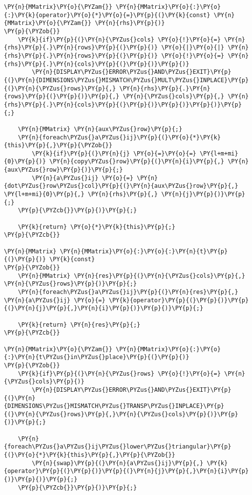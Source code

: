 \begin{Verbatim}[commandchars=\\\{\}]
\PY{n}{MMatrix}\PY{o}{\PYZam{}} \PY{n}{MMatrix}\PY{o}{:}\PY{o}{:}\PY{k}{operator}\PY{o}{*}\PY{o}{=}\PY{p}{(}\PY{k}{const} \PY{n}{MMatrix}\PY{o}{\PYZam{}} \PY{n}{rhs}\PY{p}{)}
\PY{p}{\PYZob{}}
	\PY{k}{if}\PY{p}{(}\PY{n}{\PYZus{}cols} \PY{o}{!}\PY{o}{=} \PY{n}{rhs}\PY{p}{.}\PY{n}{rows}\PY{p}{(}\PY{p}{)} \PY{o}{|}\PY{o}{|} \PY{n}{rhs}\PY{p}{.}\PY{n}{rows}\PY{p}{(}\PY{p}{)} \PY{o}{!}\PY{o}{=} \PY{n}{rhs}\PY{p}{.}\PY{n}{cols}\PY{p}{(}\PY{p}{)}\PY{p}{)}
		\PY{n}{DISPLAY\PYZus{}ERROR\PYZus{}AND\PYZus{}EXIT}\PY{p}{(}\PY{n}{DIMENSIONS\PYZus{}MISMATCH\PYZus{}MULT\PYZus{}INPLACE}\PY{p}{(}\PY{n}{\PYZus{}rows}\PY{p}{,} \PY{n}{rhs}\PY{p}{.}\PY{n}{rows}\PY{p}{(}\PY{p}{)}\PY{p}{,} \PY{n}{\PYZus{}cols}\PY{p}{,} \PY{n}{rhs}\PY{p}{.}\PY{n}{cols}\PY{p}{(}\PY{p}{)}\PY{p}{)}\PY{p}{)}\PY{p}{;}

	\PY{n}{MMatrix} \PY{n}{aux\PYZus{}row}\PY{p}{;}
	\PY{n}{foreach\PYZus{}a\PYZus{}ij}\PY{p}{(}\PY{o}{*}\PY{k}{this}\PY{p}{,}\PY{p}{\PYZob{}}
		\PY{k}{if}\PY{p}{(}\PY{n}{j} \PY{o}{=}\PY{o}{=} \PY{l+m+mi}{0}\PY{p}{)} \PY{n}{copy\PYZus{}row}\PY{p}{(}\PY{n}{i}\PY{p}{,} \PY{n}{aux\PYZus{}row}\PY{p}{)}\PY{p}{;}
		\PY{n}{a\PYZus{}ij} \PY{o}{=} \PY{n}{dot\PYZus{}row\PYZus{}col}\PY{p}{(}\PY{n}{aux\PYZus{}row}\PY{p}{,} \PY{l+m+mi}{0}\PY{p}{,} \PY{n}{rhs}\PY{p}{,} \PY{n}{j}\PY{p}{)}\PY{p}{;}
	\PY{p}{\PYZcb{}}\PY{p}{)}\PY{p}{;}

	\PY{k}{return} \PY{o}{*}\PY{k}{this}\PY{p}{;}
\PY{p}{\PYZcb{}}

\PY{n}{MMatrix} \PY{n}{MMatrix}\PY{o}{:}\PY{o}{:}\PY{n}{t}\PY{p}{(}\PY{p}{)} \PY{k}{const}
\PY{p}{\PYZob{}}
	\PY{n}{MMatrix} \PY{n}{res}\PY{p}{(}\PY{n}{\PYZus{}cols}\PY{p}{,} \PY{n}{\PYZus{}rows}\PY{p}{)}\PY{p}{;}
	\PY{n}{foreach\PYZus{}a\PYZus{}ij}\PY{p}{(}\PY{n}{res}\PY{p}{,} \PY{n}{a\PYZus{}ij} \PY{o}{=} \PY{k}{operator}\PY{p}{(}\PY{p}{)}\PY{p}{(}\PY{n}{j}\PY{p}{,}\PY{n}{i}\PY{p}{)}\PY{p}{)}\PY{p}{;}

	\PY{k}{return} \PY{n}{res}\PY{p}{;}
\PY{p}{\PYZcb{}}

\PY{n}{MMatrix}\PY{o}{\PYZam{}} \PY{n}{MMatrix}\PY{o}{:}\PY{o}{:}\PY{n}{t\PYZus{}in\PYZus{}place}\PY{p}{(}\PY{p}{)}
\PY{p}{\PYZob{}}
	\PY{k}{if}\PY{p}{(}\PY{n}{\PYZus{}rows} \PY{o}{!}\PY{o}{=} \PY{n}{\PYZus{}cols}\PY{p}{)}
		\PY{n}{DISPLAY\PYZus{}ERROR\PYZus{}AND\PYZus{}EXIT}\PY{p}{(}\PY{n}{DIMENSIONS\PYZus{}MISMATCH\PYZus{}TRANSP\PYZus{}INPLACE}\PY{p}{(}\PY{n}{\PYZus{}rows}\PY{p}{,}\PY{n}{\PYZus{}cols}\PY{p}{)}\PY{p}{)}\PY{p}{;}

	\PY{n}{foreach\PYZus{}a\PYZus{}ij\PYZus{}lower\PYZus{}triangular}\PY{p}{(}\PY{o}{*}\PY{k}{this}\PY{p}{,}\PY{p}{\PYZob{}}
		\PY{n}{swap}\PY{p}{(}\PY{n}{a\PYZus{}ij}\PY{p}{,} \PY{k}{operator}\PY{p}{(}\PY{p}{)}\PY{p}{(}\PY{n}{j}\PY{p}{,}\PY{n}{i}\PY{p}{)}\PY{p}{)}\PY{p}{;}
	\PY{p}{\PYZcb{}}\PY{p}{)}\PY{p}{;}


\end{Verbatim}
